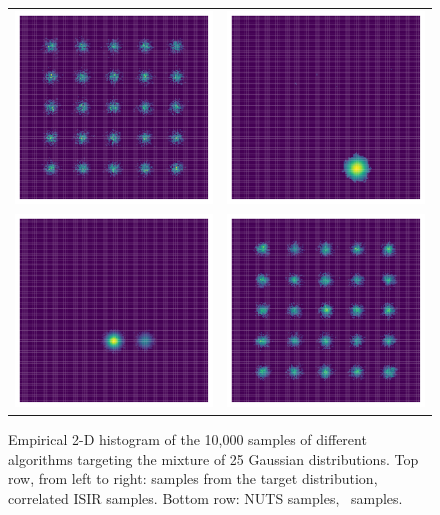 \documentclass{article}
\begin{document}
\begin{figure}[!ht]
    \centering
    \begin{tabular}{cc}
      \includegraphics[width = .4\linewidth]{pics/histogram_true.pdf}
      &\includegraphics[width = .4\linewidth]{pics/histogram_isir.pdf}  \\
       \includegraphics[width = .4\linewidth]{pics/histogram_nuts.pdf}
       &\includegraphics[width = .4\linewidth]{pics/histogram_infine.pdf}
    \end{tabular}
    \caption{Empirical 2-D histogram of the 10,000 samples of different algorithms targeting the mixture of 25 Gaussian distributions. Top row, from left to right: samples from the target distribution, correlated ISIR samples. Bottom row: NUTS samples, \InFiNE\ samples.}
    \label{fig:25_gauss_mcmc}
\end{figure}
\end{document}
